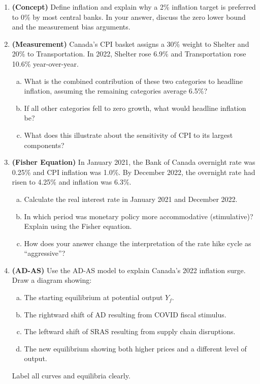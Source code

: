 \begin{enumerate}

\item \textbf{(Concept)} Define inflation and explain why a 2\% inflation
target is preferred to 0\% by most central banks. In your answer, discuss
the zero lower bound and the measurement bias arguments.

\item \textbf{(Measurement)} Canada's CPI basket assigns a 30\% weight
to Shelter and 20\% to Transportation. In 2022, Shelter rose 6.9\% and
Transportation rose 10.6\% year-over-year.
\begin{enumerate}[(a)]
  \item What is the combined contribution of these two categories to
        headline inflation, assuming the remaining categories average
        6.5\%?
  \item If all other categories fell to zero growth, what would headline
        inflation be?
  \item What does this illustrate about the sensitivity of CPI to
        its largest components?
\end{enumerate}

\item \textbf{(Fisher Equation)} In January 2021, the Bank of Canada
overnight rate was 0.25\% and CPI inflation was 1.0\%. By December 2022,
the overnight rate had risen to 4.25\% and inflation was 6.3\%.
\begin{enumerate}[(a)]
  \item Calculate the real interest rate in January 2021 and December 2022.
  \item In which period was monetary policy more accommodative (stimulative)?
        Explain using the Fisher equation.
  \item How does your answer change the interpretation of the rate hike
        cycle as ``aggressive''?
\end{enumerate}

\item \textbf{(AD-AS)} Use the AD-AS model to explain Canada's 2022
inflation surge. Draw a diagram showing:
\begin{enumerate}[(a)]
  \item The starting equilibrium at potential output $Y_f$.
  \item The rightward shift of AD resulting from COVID fiscal stimulus.
  \item The leftward shift of SRAS resulting from supply chain disruptions.
  \item The new equilibrium showing both higher prices and a different
        level of output.
\end{enumerate}
Label all curves and equilibria clearly.


\end{enumerate}
